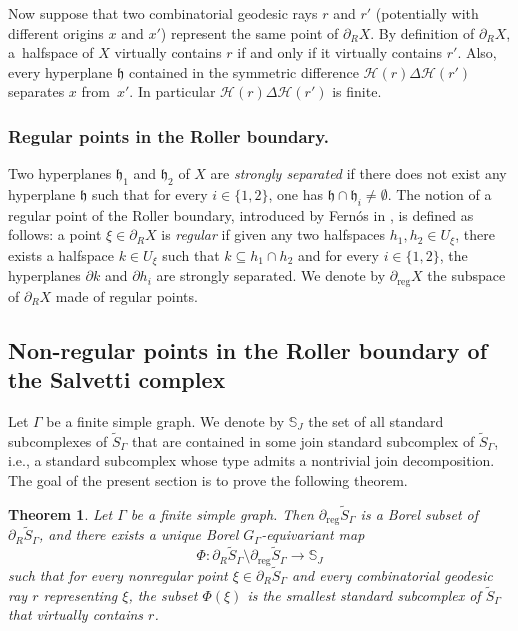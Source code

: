 \documentclass[11pt]{article}
\newcommand{\ie}{i.e.,\xspace}
\newcommand{\Subsection}{\subsection}
\numberwithin{equation}{section}
\let\mathcal\mathscr
\theoremstyle{plain}
\newtheorem{theo}{Theorem}[section]
\theoremstyle{definition}
\newcommand{\calh}{\mathcal{H}}
\newcommand{\reg}{\mathrm{reg}}
\begin{document}
Now suppose that two combinatorial geodesic rays $r$ and $r'$ (potentially with different origins $x$ and $x'$) represent the same point of $\partial_R X$. By definition of $\partial_R X$, a~halfspace of $X$ virtually contains $r$ if and only if it virtually contains $r'$. Also, \hbox{every} hyperplane $\mathfrak{h}$ contained in the symmetric difference $\calh(r)\Delta\calh(r')$ separates $x$ from~$x'$. In particular $\calh(r)\Delta\calh(r')$ is finite.

\subsubsection*{Regular points in the Roller boundary.} Two hyperplanes $\mathfrak{h}_1$ and $\mathfrak{h}_2$ of $X$ are \emph{strongly separated} \cite[Def.\,2.1]{behrstock2012divergence} if there does not exist any hyperplane $\mathfrak{h}$ such that for every $i\in\{1,2\}$, one has $\mathfrak{h}\cap\mathfrak{h}_i\neq\emptyset$. The notion of a regular point of the Roller boundary, introduced by Fernós in \cite[Def.\,7.3]{Fer}, is defined as follows: a point $\xi\in\partial_R X$ is \emph{regular} if given any two halfspaces $h_1,h_2\in U_\xi$, there exists a halfspace $k\in U_\xi$ such that $k\subseteq h_1\cap h_2$ and for every $i\in\{1,2\}$, the hyperplanes $\partial k$ and $\partial h_i$ are strongly separated. We denote by $\partial_{\reg}X$ the subspace of $\partial_R X$ made of regular points.

\Subsection{Non-regular points in the Roller boundary of the Salvetti complex}

Let $\Gamma$ be a finite simple graph. We denote by $\mathbb{S}_J$ the set of all standard subcomplexes of $\widetilde{S}_\Gamma$ that are contained in some join standard subcomplex of $\widetilde{S}_\Gamma$, \ie a standard subcomplex whose type admits a nontrivial join decomposition. The goal of the present section is to prove the following theorem.

\begin{theo}\label{theo:roller}
Let $\Gamma$ be a finite simple graph. Then $\partial_\reg\widetilde{S}_\Gamma$ is a Borel subset of $\partial_R\widetilde{S}_\Gamma$, and there exists a unique Borel $G_\Gamma$-equivariant map
\[
\Phi:\partial_R\widetilde{S}_\Gamma\setminus\partial_\reg\widetilde{S}_\Gamma\to\mathbb{S}_J
\]
such that for every nonregular point $\xi\in\partial_R\widetilde{S}_\Gamma$ and every combinatorial geodesic ray $r$ representing $\xi$, the subset $\Phi(\xi)$ is the smallest standard subcomplex of $\widetilde{S}_\Gamma$ that virtually contains $r$.
\end{theo}
\end{document}

